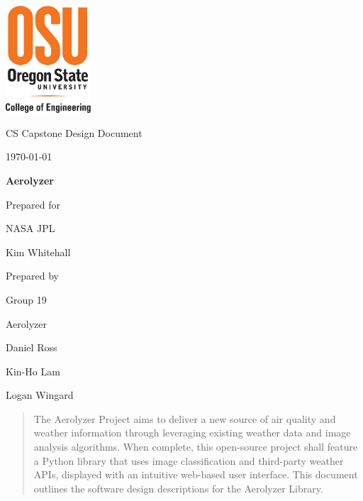 \documentclass[onecolumn, draftclsnofoot,10pt, compsoc]{IEEEtran}
\def \CapstoneTeamName{		Aerolyzer}
\def \CapstoneTeamNumber{		19}
\def \GroupMemberOne{			Daniel Ross}
\def \GroupMemberTwo{			Kin-Ho Lam}
\def \GroupMemberThree{			Logan Wingard}
\def \CapstoneProjectName{		Aerolyzer}
\def \CapstoneSponsorCompany{	NASA JPL}
\def \CapstoneSponsorPerson{		Kim Whitehall}
\def \DocType{		%
	Design Document
}
\newcommand{\NameSigPair}[1]{\par
	\makebox[2.75in][r]{#1} \hfil 	\makebox[3.25in]{\makebox[2.25in]{\hrulefill} \hfill		\makebox[.75in]{\hrulefill}}
	\par\vspace{-12pt} \textit{\tiny\noindent
		\makebox[2.75in]{} \hfil		\makebox[3.25in]{\makebox[2.25in][r]{Signature} \hfill	\makebox[.75in][r]{Date}}}}
\renewcommand{\NameSigPair}[1]{#1}
\begin{document}
	\begin{titlepage}
		\begin{singlespace}
			\centering
			\includegraphics[height=4cm,natwidth=345,natheight=435]{images/coe_v_spot1.png}
			\hfill 
			\par\vspace{.2in}
			\centering
			\scshape{
				\huge CS Capstone \DocType \par
				{\large\today}\par
				\vspace{.5in}
				\textbf{\Huge\CapstoneProjectName}\par
				\vfill
				{\large Prepared for}\par
				\Huge \CapstoneSponsorCompany\par
				\vspace{5pt}
				{\Large\NameSigPair{\CapstoneSponsorPerson}\par}
				{\large Prepared by }\par
				Group\CapstoneTeamNumber\par
				\CapstoneTeamName\par 
				\vspace{5pt}
				{\large
					\NameSigPair{\GroupMemberOne}\par
					\NameSigPair{\GroupMemberTwo}\par
					\NameSigPair{\GroupMemberThree}\par
				}
				\vspace{20pt}
			}
			\begin{abstract}  
				The Aerolyzer Project aims to deliver a new source of air quality and weather information through leveraging existing weather data and image analysis algorithms.
				When complete, this open-source project shall feature a Python library that uses image classification and third-party weather APIs, displayed with an intuitive web-based user interface.
				This document outlines the software design descriptions for the Aerolyzer Library. 
			\end{abstract}     
		\end{singlespace}
	\end{titlepage}
\end{document}
